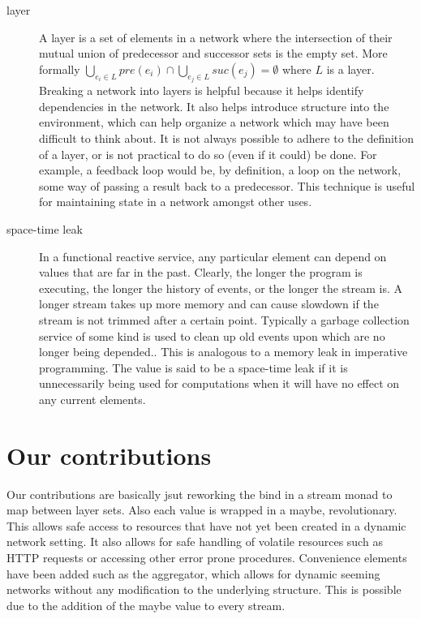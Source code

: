 \documentclass[twocolumn]{paper}
\begin{document}
\begin{description}
\item[layer] A layer is a set of elements in a network where the intersection of their mutual union of predecessor and successor sets is the empty set. More formally $\bigcup_{e_i \in L}{pre(e_i)} \cap \bigcup_{e_j \in L}{suc(e_j)} = \emptyset$ where $L$ is a layer. Breaking a network into layers is helpful because it helps identify dependencies in the network. It also helps introduce structure into the environment, which can help organize a network which may have been difficult to think about. It is not always possible to adhere to the definition of a layer, or is not practical to do so (even if it could) be done. For example, a feedback loop would be, by definition, a loop on the network, some way of passing a result back to a predecessor. This technique is useful for maintaining state in a network amongst other uses.


\item[space-time leak] In a functional reactive service, any particular element can depend on values that are far in the past. Clearly, the longer the program is executing, the longer the history of events, or the longer the stream is. A longer stream takes up more memory and can cause slowdown if the stream is not trimmed after a certain point. Typically a garbage collection service of some kind is used to clean up old events upon which are no longer being depended.. This is analogous to a memory leak in imperative programming. The value is said to be a space-time leak if it is unnecessarily being used for computations when it will have no effect on any current elements.
\end{description}


\section{Our contributions}
Our contributions are basically jsut reworking the bind in a stream monad to map between layer sets. Also each value is wrapped in a maybe, revolutionary. This allows safe access to resources that have not yet been created in a dynamic network setting. It also allows for safe handling of volatile resources such as HTTP requests or accessing other error prone procedures. Convenience elements have been added such as the aggregator, which allows for dynamic seeming networks without any modification to the underlying structure. This is possible due to the addition of the maybe value to every stream.
\end{document}
